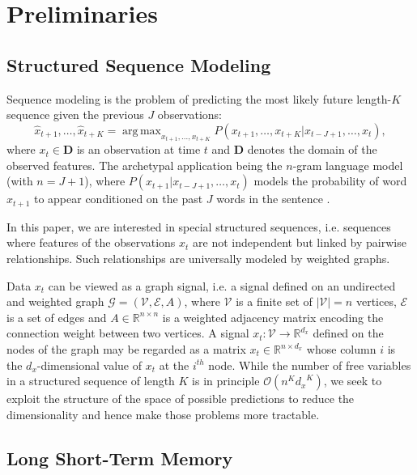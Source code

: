 \documentclass{article}
\DeclareMathOperator*{\argmax}{arg\,max}
\newcommand{\R}{\mathbb{R}}
\newcommand{\bO}{\mathcal{O}}
\newcommand{\G}{\mathcal{G}}
\newcommand{\V}{\mathcal{V}}
\newcommand{\E}{\mathcal{E}}
\begin{document}
\section{Preliminaries}


\subsection{Structured Sequence Modeling}

Sequence modeling is the problem of predicting the most likely future
length-$K$ sequence given the previous $J$ observations:
\begin{equation} \label{eqn:seq}
	\hat{x}_{t+1}, \ldots, \hat{x}_{t+K} =
	\argmax_{x_{t+1}, \ldots, x_{t+K}}
	P(x_{t+1}, \ldots, x_{t+K} | x_{t-J+1}, \ldots, x_t),
\end{equation}
where $x_t \in \mathbf{D}$ is an observation at time $t$ and $\mathbf{D}$
denotes the domain of the observed features. The archetypal application being
the $n$-gram language model (with $n = J+1$), where $P(x_{t+1} | x_{t-J+1},
\ldots, x_t)$ models the probability of word $x_{t+1}$ to appear conditioned on
the past $J$ words in the sentence \citep{seq_graves}.

In this paper, we are interested in special structured sequences, i.e. sequences where features of the observations $x_t$ are not independent but linked by pairwise relationships. Such relationships are universally modeled by weighted graphs. 

Data $x_t$ can be viewed as a graph signal, i.e.
a signal defined on an undirected and weighted graph $\G = (\V, \E, A)$, where
$\V$ is a finite set of $|\V| = n$ vertices, $\E$ is a set of edges and $A \in
\R^{n \times n}$ is a weighted adjacency matrix encoding the connection weight
between two vertices. A signal $x_t: \V \rightarrow \R^{d_x}$ defined on the
nodes of the graph may be regarded as a matrix $x_t \in \R^{n \times d_x}$
whose column $i$ is the $d_x$-dimensional value of $x_t$ at the $i^{th}$ node.
While the number of free variables in a structured sequence of length $K$ is in
principle $\bO(n^K {d_x}^K)$, we seek to exploit the structure of the space
of possible predictions to reduce the dimensionality and hence make those
problems more tractable.

\subsection{Long Short-Term Memory}
\end{document}
